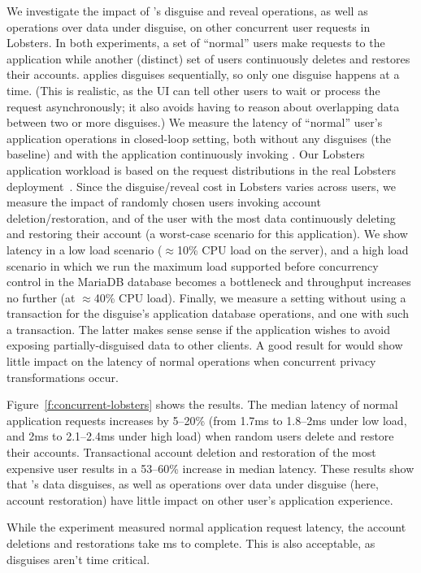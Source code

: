 %
We investigate the impact of \sys's disguise and reveal operations, as well as
operations over data under disguise, on other concurrent user requests in Lobsters.
%
In both experiments, a set of ``normal'' users make requests to the application
while another (distinct) set of users continuously deletes and restores their
accounts.
%
\sys applies disguises sequentially, so only one disguise happens at a time.
%
(This is realistic, as the UI can tell other users to wait or process the request
asynchronously; it also avoids \sys having to reason about overlapping data between
two or more disguises.)
%
We measure the latency of ``normal'' user's application operations in closed-loop
setting, both without any disguises (the baseline) and with the application
continuously invoking \sys.
%
Our Lobsters application workload is based on the request distributions in the real
Lobsters deployment~\cite{lobsters-data}.
%
Since the disguise/reveal cost in Lobsters varies across users, we measure the
impact of randomly chosen users invoking account deletion/restoration, and of
the user with the most data continuously deleting and restoring their account
(a worst-case scenario for this application).
%
We show latency in a low load scenario ($\approx$10\% CPU load on the server),
and a high load scenario in which we run the maximum load supported before
concurrency control in the MariaDB database becomes a bottleneck
and throughput increases no further (at $\approx$40\% CPU load).
%
Finally, we measure a setting without using a transaction for the disguise's
application database operations, and one with such a transaction.
%
The latter makes sense sense if the application wishes to avoid exposing
partially-disguised data to other clients.
%
A good result for \sys would show little impact on the latency of normal operations
when concurrent privacy transformations occur.
%

%
Figure~\ref{f:concurrent-lobsters} shows the results.
%
The median latency of normal application requests increases by 5--20\% (from
1.7ms to 1.8--2ms under low load, and 2ms to 2.1--2.4ms under high load) when
random users delete and restore their accounts.
%
Transactional account deletion and restoration of the most expensive user
results in a 53--60\% increase in median latency.
%
These results show that \sys's data disguises, as well as operations over
data under disguise (here, account restoration) have little impact on
other user's application experience.
%

%
While the experiment measured normal application request latency, the
account deletions and restorations take ms to complete.
%
This is also acceptable, as disguises aren't time critical.
%
